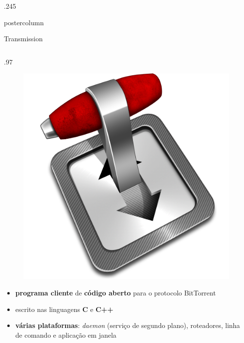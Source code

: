 \documentclass[final,brazil]{beamer}
\newenvironment{innercol}[3][.97\textwidth]{
\begin{columns}
  \hspace{#2}
  \begin{column}{#1}
    \vspace{#3}
    \justifying
}{
  \end{column}
\end{columns}
}
\begin{document}
\begin{frame}
\begin{columns}
\begin{column}{.245\textwidth}
\begin{beamercolorbox}[center,wd=\textwidth]{postercolumn}
\begin{minipage}[T]{.95\textwidth}
{            \begin{block}{Transmission}
              \begin{innercol}{-4ex}{-1.4ex}
                \begin{figure}
                  \vspace{-1ex}
                  \includegraphics[width=\linewidth]{transmission.png}
                \end{figure}

                \begin{itemize}
                  \justifying
                  \vspace{-3ex}
                  \item \textbf{programa cliente} de \textbf{código aberto} para o
                    protocolo BitTorrent
                  \item escrito nas linguagens \textbf{C} e \textbf{C++}
                  \item \textbf{várias plataformas}: \emph{daemon} (serviço de segundo
                    plano), roteadores, linha de comando e aplicação em janela
                \end{itemize}
              \end{innercol}
            \end{block}

}
\end{minipage}
\end{beamercolorbox}
\end{column}
\end{columns}
\end{frame}
\end{document}
